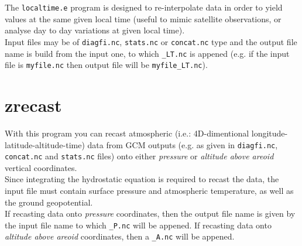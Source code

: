 The {\tt localtime.e} program is designed to re-interpolate data in order
to yield values at the same given local time (useful to mimic satellite
observations, or analyse day to day variations at given local time).\\
Input files may be of {\tt diagfi.nc}, {\tt stats.nc} or {\tt concat.nc}
type and the output file name is build from the input one, to which 
{\tt \_LT.nc} is appened (e.g. if the input file is {\tt myfile.nc} then
output file will be {\tt myfile\_LT.nc}).

\section{zrecast}
With this program you can recast atmospheric (i.e.: 4D-dimentional
longitude-latitude-altitude-time) data from GCM outputs (e.g. as given in
{\tt diagfi.nc}, {\tt concat.nc} and {\tt stats.nc} files) onto
either {\it pressure} or {\it altitude above areoid} vertical coordinates.\\
Since integrating the hydrostatic equation is required to recast the data,
the input file must contain surface pressure and atmospheric temperature,
as well as the ground geopotential.\\
If recasting data onto {\it pressure} coordinates, then the output file name
is given by the input file name to which {\tt\_P.nc} will be appened.
If recasting data onto {\it altitude above areoid} coordinates, then a
{\tt\_A.nc} will be appened.


%
